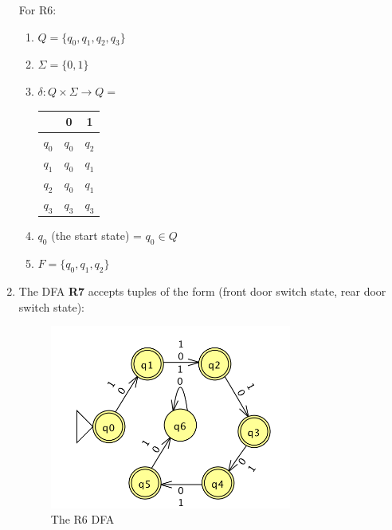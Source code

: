 \documentclass[11pt,a4paper]{article}
\begin{document}
\begin{enumerate}
                For R6:
                \begin{enumerate}
                    \item $Q = \{q_0, q_1, q_2, q_3\}$
                    \item $\Sigma = \{0, 1\}$
                    \item $\delta \colon Q \times \Sigma \rightarrow Q =$
                    \begin{tabular}{c|c|c}
                         & 0 & 1 \\ \hline
                        $q_0$ & $q_0$ & $q_2$ \\ \hline
                        $q_1$ & $q_0$ & $q_1$ \\ \hline
                        $q_2$ & $q_0$ & $q_1$ \\ \hline
                        $q_3$ & $q_3$ & $q_3$ \\ \hline
                    \end{tabular}
                    \item $q_0$ (the start state) = $q_0 \in Q$
                    \item $F = \{q_0, q_1, q_2\}$
                \end{enumerate}

            \item The DFA \textbf{R7} accepts tuples of the form (front door switch state, rear door switch state):\\
            \begin{figure}[H]
                \centering
                \includegraphics[width=0.75\textwidth]{A7}
                \caption{The R6 DFA}
            \end{figure}


\end{enumerate}
\end{document}
